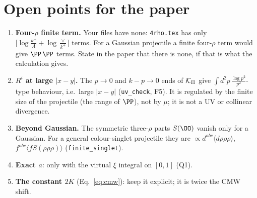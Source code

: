\section{Open points for the paper}\label{sec:open}
\begin{enumerate}
\item \textbf{Four-$\rho$ finite term.} Your files have none: \texttt{4rho.tex} has only $\big[\log\frac{k^+}{\Lambda}+\log\frac{\vee}{k^+}\big]$ terms. For a Gaussian projectile a finite four-$\rho$ term would give $\PP\,\PP$ terms. State in the paper that there is none, if that is what the calculation gives.
\item \textbf{$R^i$ at large $|x-y|$.} The $p\to0$ and $k-p\to0$ ends of $\mathcal K_{\rm II}$ give $\int d^2p\,\frac{\log p^2}{p^2}$-type behaviour, i.e.\ large $|x-y|$ (\texttt{uv\_check}, F5). It is regulated by the finite size of the projectile (the range of $\PP$), not by $\mu$; it is not a UV or collinear divergence.
\item \textbf{Beyond Gaussian.} The symmetric three-$\rho$ parts $S(\OO)$ vanish only for a Gaussian. For a general colour-singlet projectile they are $\propto d^{abc}\langle d\rho\rho\rho\rangle$, $f^{abc}\langle fS(\rho\rho\rho)\rangle$ (\texttt{finite\_singlet}).
\item \textbf{Exact $a$}: only with the virtual $\xi$ integral on $[0,1]$ (Q1).
\item \textbf{The constant $2K$} (Eq.~\eqref{eq:cmw}): keep it explicit; it is twice the CMW shift.
\end{enumerate}

